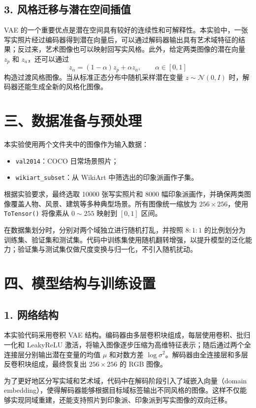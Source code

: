\documentclass[12pt,a4paper]{ctexart}
\begin{document}
\subsection*{3. 风格迁移与潜在空间插值}
VAE 的一个重要优点是潜在空间具有较好的连续性和可解释性。本实验中，一张写实照片经过编码器得到潜在向量后，可以通过解码器输出具有艺术域特征的结果；反过来，艺术图像也可以映射回写实风格。此外，给定两类图像的潜在向量 $z_p$ 和 $z_a$，还可以通过
\[
z_{\alpha}=(1-\alpha)z_p+\alpha z_a,\qquad \alpha\in[0,1]
\]
构造过渡风格图像。当从标准正态分布中随机采样潜在变量 $z\sim\mathcal{N}(0,I)$ 时，解码器还能生成全新的风格化图像。

\section*{三、数据准备与预处理}
本实验使用两个文件夹中的图像作为输入数据：
\begin{itemize}
    \item \texttt{val2014}：COCO 日常场景照片；
    \item \texttt{wikiart\_subset}：从 WikiArt 中筛选出的印象派画作子集。
\end{itemize}
根据实验要求，最终选取 10000 张写实照片和 8000 幅印象派画作，并确保两类图像覆盖人物、风景、建筑等多种典型场景。所有图像统一缩放为 $256\times 256$，使用 \texttt{ToTensor()} 将像素从 $0\sim255$ 映射到 $[0,1]$ 区间。

在数据集划分时，分别对两个域独立进行随机打乱，并按照 $8:1:1$ 的比例划分为训练集、验证集和测试集。代码中训练集使用随机翻转增强，以提升模型的泛化能力；验证集与测试集仅做尺度变换与归一化，不引入随机扰动。

\section*{四、模型结构与训练设置}

\subsection*{1. 网络结构}
本实验代码采用卷积 VAE 结构。编码器由多层卷积块组成，每层使用卷积、批归一化和 LeakyReLU 激活，将输入图像逐步压缩为高维特征表示；随后通过两个全连接层分别输出潜在变量的均值 $\mu$ 和对数方差 $\log\sigma^2$。解码器由全连接层和多层反卷积块组成，最终恢复出 $256\times256$ 的 RGB 图像。

为了更好地区分写实域和艺术域，代码中在解码阶段引入了域嵌入向量（domain embedding），使得解码器能够根据目标域标签输出不同风格的图像。这样不仅能够实现同域重建，还能支持照片到印象派、印象派到写实图像的双向迁移。
\end{document}
